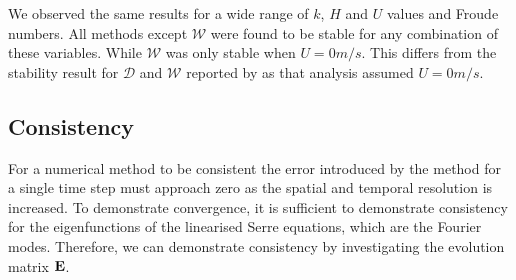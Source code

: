 
We observed the same results for a wide range of $k$, $H$ and $U$ values and Froude numbers. All methods except $\mathcal{W}$ were found to be stable for any combination of these variables. While $\mathcal{W}$ was only stable when $U = 0m/s$. This differs from the stability result for $\mathcal{D}$ and $\mathcal{W}$ reported by \citet{Pitt-2018-61} as that analysis assumed $U=0m/s$.

\subsection{Consistency}
For a numerical method to be consistent the error introduced by the method for a single time step must approach zero as the spatial and temporal resolution is increased. To demonstrate convergence, it is sufficient to demonstrate consistency for the eigenfunctions of the linearised Serre equations, which are the Fourier modes. Therefore, we can demonstrate consistency by investigating the evolution matrix $\mathbf{E}$. 

